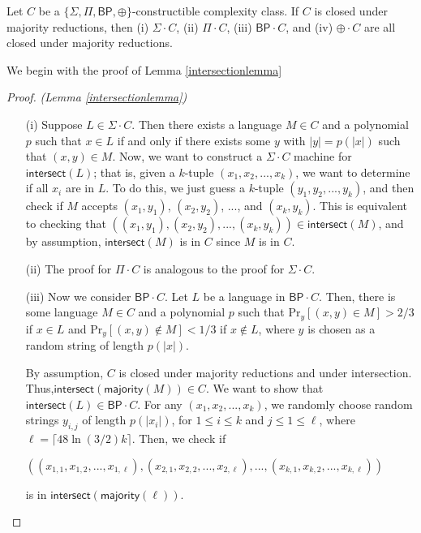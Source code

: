 \documentclass[11pt]{article}
\newcommand{\pr}{\text{Pr}}
\newcommand{\bp}{\textsf{BP}}
\newcommand{\strongbp}{\widehat{\textsf{BP}}}
\newcommand{\parity}{\oplus}
\newcommand{\intersect}{\textsf{intersect}}
\newcommand{\majority}{\textsf{majority}}
\begin{document}
\begin{lemma}\label{amplifymainlemma}
Let $C$ be a \emph{$\{\Sigma,\Pi,\bp,\parity\}$}-constructible complexity class. If $C$ is closed under majority reductions, then (i) \emph{$\Sigma \cdot C$}, (ii) \emph{$\Pi \cdot C$}, (iii) \emph{$\bp \cdot C$}, and (iv) \emph{$\parity \cdot C$} are all closed under majority reductions.
\end{lemma}
We begin with the proof of Lemma \ref{intersectionlemma}
\begin{proof} \emph{(Lemma \ref{intersectionlemma})}
\begin{enumerate}
\item[(i)] Suppose $L \in \Sigma\cdot C$. Then there exists a language $M\in C$ and a polynomial $p$ such that $x \in L$ if and only if there exists some $y$ with $|y| = p(|x|)$ such that $(x, y)\in M$. Now, we want to construct a $\Sigma \cdot C$ machine for $\intersect(L)$; that is, given a $k$-tuple $(x_1,x_2,...,x_k)$, we want to determine if all $x_i$ are in $L$. To do this, we just guess a $k$-tuple $(y_1,y_2,...,y_k)$, and then check if $M$ accepts $(x_1, y_1)$, $(x_2, y_2)$, ..., and $(x_k, y_k)$. This is equivalent to checking that $((x_1,y_1),(x_2,y_2),...,(x_k,y_k)) \in \intersect(M)$, and by assumption, $\intersect(M)$ is in $C$ since $M$ is in $C$.

\item[(ii)] The proof for $\Pi \cdot C$ is analogous to the proof for $\Sigma \cdot C$.


\item[(iii)] Now we consider $\bp \cdot C$. Let $L$ be a language in $\bp \cdot C$. Then, there is some language $M \in C$ and a polynomial $p$ such that $\pr_y[(x,y) \in M] > 2/3$ if $x\in L$ and $\pr_y[(x,y) \not \in M] < 1/3$ if $x\not\in L$, where $y$ is chosen as a random string of length $p(|x|)$.

By assumption, $C$ is closed under majority reductions and under intersection. Thus,\linebreak $\intersect(\majority(M)) \in C$. We want to show that $\intersect(L) \in \bp\cdot C$. For any $(x_1,x_2,...,x_k)$, we randomly choose random strings $y_{i,j}$ of length $p(|x_i|)$, for $1\le i\le k$ and $j\le 1\le \ell$, where $\ell = \lceil 48\ln(3/2)k \rceil$. Then, we check if
\begin{center}
$((x_{1,1},x_{1,2},...,x_{1,\ell}),(x_{2,1},x_{2,2},...,x_{2,\ell}),...,(x_{k,1},x_{k,2},...,x_{k,\ell}))$
\end{center}
is in $\intersect(\majority(\ell))$.


\end{enumerate}
\end{proof}
\end{document}
